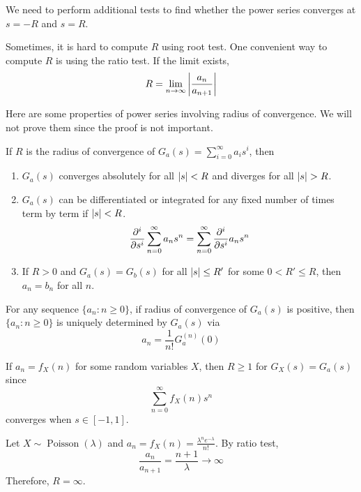 \documentclass{huhtakm-template-book}
\DeclareMathOperator{\Poisson}{Poisson}
\begin{document}
\begin{rem}
	We need to perform additional tests to find whether the power series converges at $s=-R$ and $s=R$.
\end{rem}
\begin{rem}
	Sometimes, it is hard to compute $R$ using root test. One convenient way to compute $R$ is using the ratio test. If the limit exists,
	\begin{equation*}
		R=\lim_{n\to\infty}\left|{\frac{a_{n}}{a_{n+1}}}\right|
	\end{equation*}
\end{rem}

\newpage
Here are some properties of power series involving radius of convergence. We will not prove them since the proof is not important.
\begin{thm}
	If $R$ is the radius of convergence of $G_{a}(s)=\sum_{i=0}^{\infty}a_{i}s^{i}$, then
	\begin{enumerate}
		\item $G_{a}(s)$ converges absolutely for all $\left|{s}\right|<R$ and diverges for all $\abs{s}>R$.
		\item $G_{a}(s)$ can be differentiated or integrated for any fixed number of times term by term if $\left|{s}\right|<R$.
		\begin{equation*}
			\pdv*[order={i}]{\sum_{n=0}^{\infty}a_{n}s^{n}}{s}=\sum_{n=0}^{\infty}\pdv*[order={i}]{a_{n}s^{n}}{s}
		\end{equation*}
		\item If $R>0$ and $G_{a}(s)=G_{b}(s)$ for all $\left|{s}\right|\leq R'$ for some $0<R'\leq R$, then $a_{n}=b_{n}$ for all $n$.
	\end{enumerate}
\end{thm}
\begin{rem}
	For any sequence $\{a_{n}:n\geq 0\}$, if radius of convergence of $G_{a}(s)$ is positive, then $\{a_{n}:n\geq 0\}$ is uniquely determined by $G_{a}(s)$ via
	\begin{equation*}
		a_{n}=\frac{1}{n!}G_{a}^{(n)}(0)
	\end{equation*}
\end{rem}
\begin{rem}
	If $a_{n}=f_{X}(n)$ for some random variables $X$, then $R\geq 1$ for $G_{X}(s)=G_{a}(s)$ since
	\begin{equation*}
		\sum_{n=0}^{\infty}f_{X}(n)s^{n}
	\end{equation*}
	converges when $s\in[-1,1]$.
\end{rem}
\begin{eg}
	Let $X\sim\Poisson(\lambda)$ and  $a_{n}=f_{X}(n)=\frac{\lambda^{n}e^{-\lambda}}{n!}$. By ratio test,
	\begin{equation*}
		\frac{a_{n}}{a_{n+1}}=\frac{n+1}{\lambda}\to\infty
	\end{equation*}
	Therefore, $R=\infty$.
\end{eg}
\end{document}
